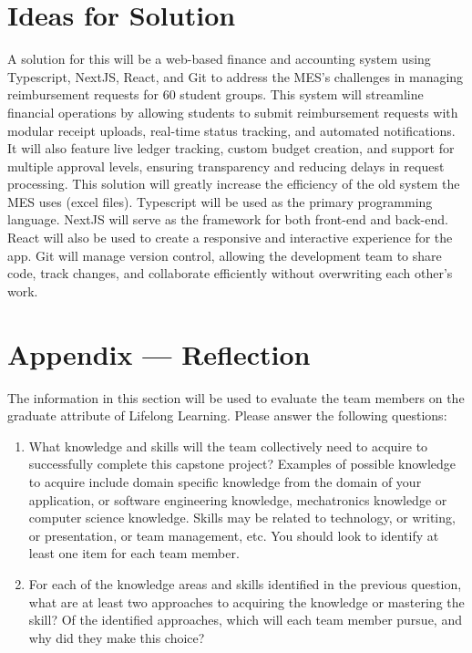 \documentclass[12pt]{article}
\begin{document}
\section{Ideas for Solution}
A solution for this will be a web-based finance and accounting system using Typescript, NextJS, React, and Git to address the MES's challenges in managing reimbursement requests for 60 student groups. This system will streamline financial operations by allowing students to submit reimbursement requests with modular receipt uploads, real-time status tracking, and automated notifications. It will also feature live ledger tracking, custom budget creation, and support for multiple approval levels, ensuring transparency and reducing delays in request processing. This solution will greatly increase the efficiency of the old system the MES uses (excel files). Typescript will be used as the primary programming language. NextJS will serve as the framework for both front-end and back-end. React will also be used to create a responsive and interactive experience for the app. Git will manage version control, allowing the development team to share code, track changes, and collaborate efficiently without overwriting each other’s work. 
\newpage{}
\section*{Appendix --- Reflection}

The information in this section will be used to evaluate the team members on the
graduate attribute of Lifelong Learning.  Please answer the following questions:

\begin{enumerate}
  \item What knowledge and skills will the team collectively need to acquire to
  successfully complete this capstone project?  Examples of possible knowledge
  to acquire include domain specific knowledge from the domain of your
  application, or software engineering knowledge, mechatronics knowledge or
  computer science knowledge.  Skills may be related to technology, or writing,
  or presentation, or team management, etc.  You should look to identify at
  least one item for each team member.
  \item For each of the knowledge areas and skills identified in the previous
  question, what are at least two approaches to acquiring the knowledge or
  mastering the skill?  Of the identified approaches, which will each team
  member pursue, and why did they make this choice?
\end{enumerate}
\end{document}
